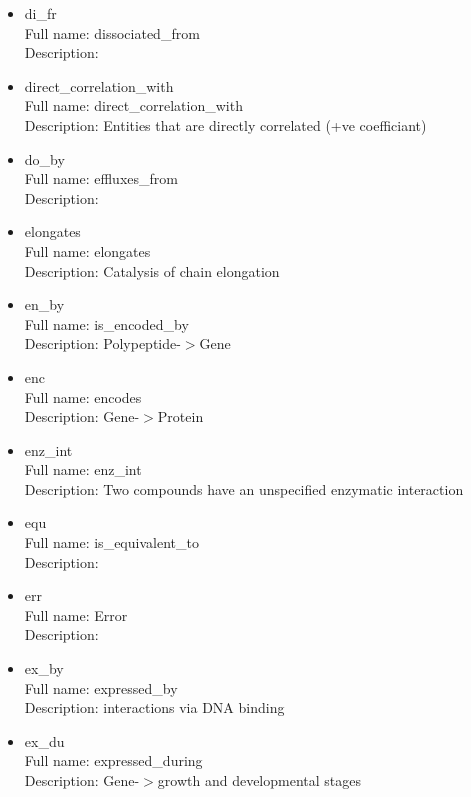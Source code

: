 \begin{itemize}
\item{di\_fr}\\ Full name: dissociated\_from\\ Description: 

\item{direct\_correlation\_with}\\ Full name: direct\_correlation\_with\\ Description: Entities that are directly correlated (+ve coefficiant) 

\item{do\_by}\\ Full name: effluxes\_from\\ Description: 

\item{elongates}\\ Full name: elongates\\ Description: Catalysis of chain elongation 

\item{en\_by}\\ Full name: is\_encoded\_by\\ Description: Polypeptide-$>$Gene 

\item{enc}\\ Full name: encodes\\ Description: Gene-$>$Protein 

\item{enz\_int}\\ Full name: enz\_int\\ Description: Two compounds have an unspecified enzymatic interaction 

\item{equ}\\ Full name: is\_equivalent\_to\\ Description: 

\item{err}\\ Full name: Error\\ Description: 

\item{ex\_by}\\ Full name: expressed\_by\\ Description: interactions via DNA binding 

\item{ex\_du}\\ Full name: expressed\_during\\ Description: Gene-$>$growth and developmental stages 


\end{itemize}
